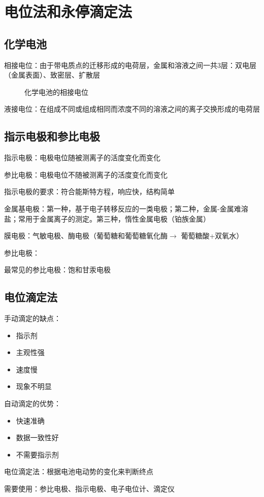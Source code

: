 \section{电位法和永停滴定法}%
\label{sec:电位法和永停滴定法}
\subsection{化学电池}%
\label{sub:化学电池}
\begin{notation}
    相接电位：由于带电质点的迁移形成的电荷层，金属和溶液之间一共3层：双电层（金属表面）、致密层、扩散层
\end{notation}
\begin{figure}[ht!]
    \centering
    \caption{化学电池的相接电位}
    \label{fig:化学电池的相接电位}
\end{figure}
\begin{notation}
    液接电位：在组成不同或组成相同而浓度不同的溶液之间的离子交换形成的电荷层
\end{notation}
\subsection{指示电极和参比电极}%
\label{sub:指示电极和参比电极}
\begin{defi}
    指示电极：电极电位随被测离子的活度变化而变化

    参比电极：电极电位不随被测离子的活度变化而变化
\end{defi}
指示电极的要求：符合能斯特方程，响应快，结构简单
\begin{notation}
    金属基电极：第一种，基于电子转移反应的一类电极；第二种，金属-金属难溶盐；常用于金属离子的测定。第三种，惰性金属电极（铂族金属）
\end{notation}
\begin{notation}
    膜电极：气敏电极、酶电极（葡萄糖和葡萄糖氧化酶$\to $ 葡萄糖酸+双氧水）
\end{notation}
参比电极：
\begin{notation}
    最常见的参比电极：饱和甘汞电极
\end{notation}
\subsection{电位滴定法}%
\label{sub:电位滴定法}
手动滴定的缺点：
\begin{itemize}
    \item 指示剂
    \item 主观性强
    \item 速度慢
    \item 现象不明显
\end{itemize}
自动滴定的优势：
\begin{itemize}
    \item 快速准确
    \item 数据一致性好
    \item 不需要指示剂
\end{itemize}
\begin{defi}
电位滴定法：根据电池电动势的变化来判断终点
\end{defi}
需要使用：参比电极、指示电极、电子电位计、滴定仪

